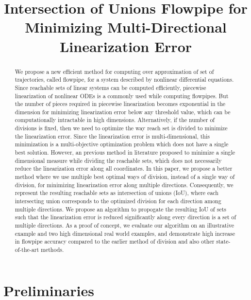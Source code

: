 


\title{Intersection of Unions Flowpipe for Minimizing Multi-Directional Linearization Error}
\author{}
\institute{}
%
    
\maketitle
%
\begin{abstract}
We propose a new efficient method for computing over approximation of
set of trajectories, called flowpipe, for a system described by
nonlinear differential equations.  Since reachable sets of linear
systems can be computed efficiently, piecewise linearization of
nonlinear ODEs is a commonly used while computing flowpipes.  But the
number of pieces required in piecewise linearization becomes
exponential in the dimension for minimizing linearization error below
any threshold value, which can be computationally intractable in high
dimensions.  Alternatively, if the number of divisions is fixed, then
we need to optimize the way reach set is divided to minimize the
linearization error.  Since the linearization error is
multi-dimensional, this minimization is a multi-objective optimization
problem which does not have a single best solution.  However, an
previous method in literature proposed to minimize a single
dimensional measure while dividing the reachable sets, which does not
necessarily reduce the linearization error along all coordinates.  In
this paper, we propose a better method where we use multiple best
optimal ways of division, instead of a single way of division, for
minimizing linearization error along multiple directions.
Consequently, we represent the resulting reachable sets as
intersection of unions (IoU), where each intersecting union
corresponds to the optimized division for each direction among
multiple directions.  We propose an algorithm to propogate the
resulting IoU of sets such that the linearization error is reduced
significantly along every direction is a set of multiple directions.
As a proof of concept, we evaluate our algorithm on an illustrative
example and two high dimensional real world examples, and demonstrate
high increase in flowpipe accuracy compared to the earlier method of division
and also other state-of-the-art methods.
\end{abstract}

\section{Preliminaries}

%

